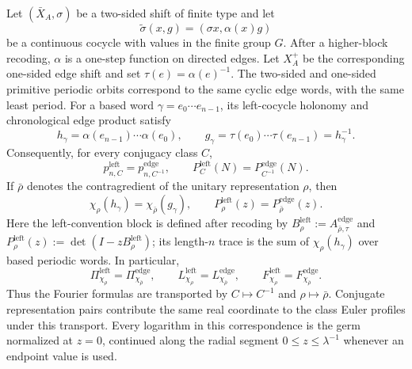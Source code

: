 \begin{lemma}
\label{lem:convention-bridge}
Let \((\bar X_A,\sigma)\) be a two-sided shift of finite type and let
\[
  \widetilde\sigma(x,g)=(\sigma x,\alpha(x)g)
\]
be a continuous cocycle with values in the finite group \(G\).  After a
higher-block recoding, \(\alpha\) is a one-step function on directed edges.
Let \(X_A^+\) be the corresponding one-sided edge shift and set
\(\tau(e)=\alpha(e)^{-1}\).  The two-sided and one-sided primitive periodic
orbits correspond to the same cyclic edge words, with the same least period.
For a based word \(\gamma=e_0\cdots e_{n-1}\), its left-cocycle holonomy and
chronological edge product satisfy
\begin{equation}\label{eq:convention-holonomy-inverse}
 h_\gamma=\alpha(e_{n-1})\cdots\alpha(e_0),
 \qquad
 g_\gamma=\tau(e_0)\cdots\tau(e_{n-1})=h_\gamma^{-1}.
\end{equation}
Consequently, for every conjugacy class \(C\),
\begin{equation}\label{eq:convention-class-counts}
 p^{\mathrm{left}}_{n,C}=p^{\mathrm{edge}}_{n,C^{-1}},
 \qquad
 P^{\mathrm{left}}_C(N)=P^{\mathrm{edge}}_{C^{-1}}(N).
\end{equation}
If \(\bar\rho\) denotes the contragredient of the unitary representation
\(\rho\), then
\begin{equation}\label{eq:convention-character-blocks}
 \chi_\rho(h_\gamma)=\chi_{\bar\rho}(g_\gamma),
 \qquad
 P^{\mathrm{left}}_\rho(z)=P^{\mathrm{edge}}_{\bar\rho}(z).
\end{equation}
Here the left-convention block is defined after recoding by
\(B^{\mathrm{left}}_\rho:=A^{\mathrm{edge}}_{\bar\rho,\tau}\) and
\(P^{\mathrm{left}}_\rho(z):=\det(I-zB^{\mathrm{left}}_\rho)\); its
length-\(n\) trace is the sum of \(\chi_\rho(h_\gamma)\) over based
periodic words.  In particular,
\begin{equation}\label{eq:convention-channel-transport}
 \Pi^{\mathrm{left}}_{\chi_\rho}
   =\Pi^{\mathrm{edge}}_{\chi_{\bar\rho}},\qquad
 L^{\mathrm{left}}_{\chi_\rho}
   =L^{\mathrm{edge}}_{\chi_{\bar\rho}},\qquad
 F^{\mathrm{left}}_{\chi_\rho}
   =F^{\mathrm{edge}}_{\chi_{\bar\rho}}.
\end{equation}
Thus the Fourier formulas are transported by
\(C\mapsto C^{-1}\) and \(\rho\mapsto\bar\rho\).  Conjugate representation
pairs contribute the same real coordinate to the class Euler profiles under
this transport.
Every logarithm in this correspondence is the germ normalized at \(z=0\),
continued along the radial segment \(0\le z\le\lambda^{-1}\) whenever an
endpoint value is used.
\end{lemma}

